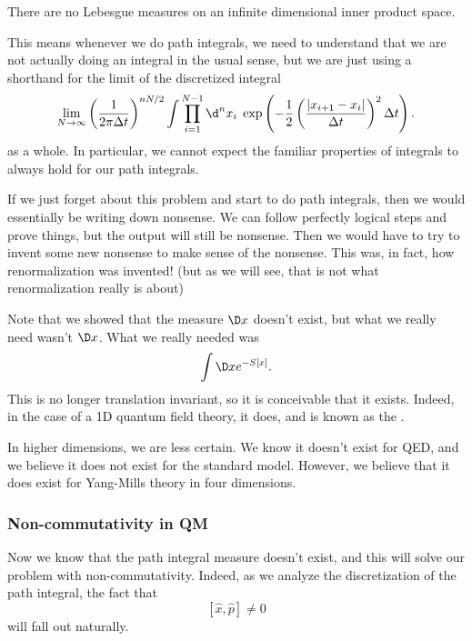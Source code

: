 \documentclass[a4paper]{article}
\begin{document}
\begin{thm}
  There are no Lebesgue measures on an infinite dimensional inner product space.
\end{thm}

This means whenever we do path integrals, we need to understand that we are not actually doing an integral in the usual sense, but we are just using a shorthand for the limit of the discretized integral
\[
  \lim_{N \to \infty} \left(\frac{1}{2\pi \Delta t}\right)^{nN/2} \int \prod_{i = 1}^{N - 1} \d^n x_i\; \exp\left(- \frac{1}{2}\left(\frac{|x_{i + 1}- x_i|}{\Delta t}\right)^2 \Delta t\right).
\]
as a whole. In particular, we cannot expect the familiar properties of integrals to always hold for our path integrals.

If we just forget about this problem and start to do path integrals, then we would essentially be writing down nonsense. We can follow perfectly logical steps and prove things, but the output will still be nonsense. Then we would have to try to invent some new nonsense to make sense of the nonsense. This was, in fact, how renormalization was invented! (but as we will see, that is not what renormalization really is about)

Note that we showed that the measure $\D x$ doesn't exist, but what we really need wasn't $\D x$. What we really needed was
\[
  \int \D x e^{-S[x]}.
\]
This is no longer translation invariant, so it is conceivable that it exists. Indeed, in the case of a 1D quantum field theory, it does, and is known as the .

In higher dimensions, we are less certain. We know it doesn't exist for QED, and we believe it does not exist for the standard model. However, we believe that it does exist for Yang-Mills theory in four dimensions.

\subsubsection*{Non-commutativity in QM}
Now we know that the path integral measure doesn't exist, and this will solve our problem with non-commutativity. Indeed, as we analyze the discretization of the path integral, the fact that
\[
  [\hat{x}, \hat{p}] \not= 0
\]
will fall out naturally.
\end{document}
